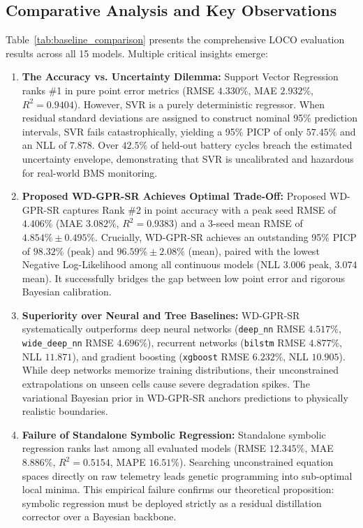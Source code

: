 \documentclass[a4paper,fleqn]{cas-sc}
\begin{document}
\subsection{Comparative Analysis and Key Observations}
Table~\ref{tab:baseline_comparison} presents the comprehensive LOCO evaluation results across all 15 models. Multiple critical insights emerge:
\begin{enumerate}
    \item \textbf{The Accuracy vs. Uncertainty Dilemma:} Support Vector Regression ranks \#1 in pure point error metrics (RMSE $4.330\%$, MAE $2.932\%$, $R^2 = 0.9404$). However, SVR is a purely deterministic regressor. When residual standard deviations are assigned to construct nominal 95\% prediction intervals, SVR fails catastrophically, yielding a 95\% PICP of only $57.45\%$ and an NLL of $7.878$. Over $42.5\%$ of held-out battery cycles breach the estimated uncertainty envelope, demonstrating that SVR is uncalibrated and hazardous for real-world BMS monitoring.
    \item \textbf{Proposed WD-GPR-SR Achieves Optimal Trade-Off:} Proposed WD-GPR-SR captures Rank \#2 in point accuracy with a peak seed RMSE of $4.406\%$ (MAE $3.082\%$, $R^2 = 0.9383$) and a 3-seed mean RMSE of $4.854\% \pm 0.495\%$. Crucially, WD-GPR-SR achieves an outstanding 95\% PICP of $98.32\%$ (peak) and $96.59\% \pm 2.08\%$ (mean), paired with the lowest Negative Log-Likelihood among all continuous models (NLL $3.006$ peak, $3.074$ mean). It successfully bridges the gap between low point error and rigorous Bayesian calibration.
    \item \textbf{Superiority over Neural and Tree Baselines:} WD-GPR-SR systematically outperforms deep neural networks (\texttt{deep\_nn} RMSE $4.517\%$, \texttt{wide\_deep\_nn} RMSE $4.696\%$), recurrent networks (\texttt{bilstm} RMSE $4.877\%$, NLL $11.871$), and gradient boosting (\texttt{xgboost} RMSE $6.232\%$, NLL $10.905$). While deep networks memorize training distributions, their unconstrained extrapolations on unseen cells cause severe degradation spikes. The variational Bayesian prior in WD-GPR-SR anchors predictions to physically realistic boundaries.
    \item \textbf{Failure of Standalone Symbolic Regression:} Standalone symbolic regression ranks last among all evaluated models (RMSE $12.345\%$, MAE $8.886\%$, $R^2 = 0.5154$, MAPE $16.51\%$). Searching unconstrained equation spaces directly on raw telemetry leads genetic programming into sub-optimal local minima. This empirical failure confirms our theoretical proposition: symbolic regression must be deployed strictly as a residual distillation corrector over a Bayesian backbone.
\end{enumerate}
\end{document}
